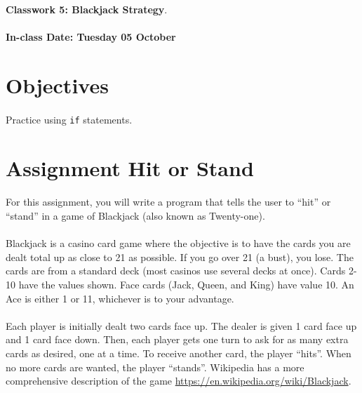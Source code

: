 \documentclass[letter,11pt]{article}
\begin{document}
\huge
\textbf{Classwork 5: Blackjack Strategy}.
\normalsize
\\ ~~ \\
\textbf{In-class Date: Tuesday 05 October}

\section*{Objectives}
\paragraph{}Practice using \texttt{if} statements.

\section*{Assignment Hit or Stand}
\paragraph{}For this assignment, you will write a program that tells the user to ``hit'' or ``stand'' in a game of Blackjack (also known as Twenty-one).
\paragraph{}Blackjack is a casino card game where the objective is to have the cards you are dealt total up as close to 21 as possible. If you go over 21 (a bust), you lose. The cards are from a standard deck (most casinos use several decks at once). Cards 2-10 have the values shown. Face cards (Jack, Queen, and King) have value 10. An Ace is either 1 or 11, whichever is to your advantage.
\paragraph{}Each player is initially dealt two cards face up. The dealer is given 1 card face up and 1 card face down. Then, each player gets one turn to ask for as many extra cards as desired, one at a time. To receive another card, the player ``hits''. When no more cards are wanted, the player ``stands''. Wikipedia has a more comprehensive description of the game \url{https://en.wikipedia.org/wiki/Blackjack}.
\end{document}
